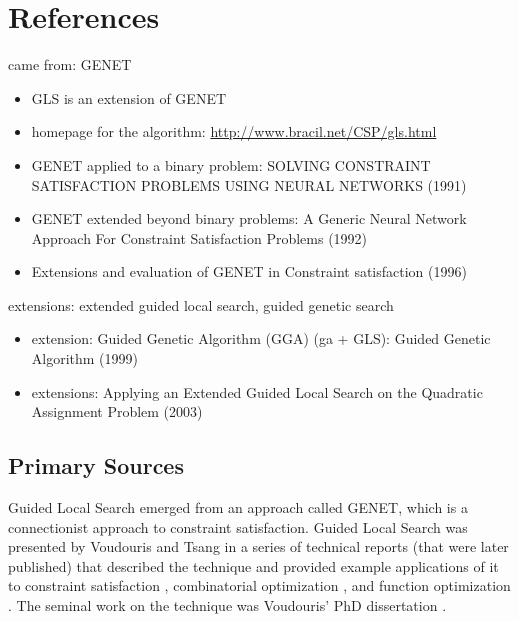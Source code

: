 \documentclass[a4paper, 11pt]{article}
\begin{document}
\section{References}
\label{sec:references}

came from: GENET
\begin{itemize}
	\item GLS is an extension of GENET
	\item homepage for the algorithm: \url{http://www.bracil.net/CSP/gls.html}
	\item GENET applied to a binary problem: SOLVING CONSTRAINT SATISFACTION PROBLEMS USING NEURAL NETWORKS (1991)
	\item GENET extended beyond binary problems: A Generic Neural Network Approach For Constraint Satisfaction Problems (1992)
	\item Extensions and evaluation of GENET in Constraint satisfaction (1996)
\end{itemize}


extensions: extended guided local search, guided genetic search
\begin{itemize}
	\item extension: Guided Genetic Algorithm (GGA) (ga + GLS): Guided Genetic Algorithm (1999)
	\item extensions: Applying an Extended Guided Local Search on the Quadratic Assignment Problem (2003)
\end{itemize}


% 
% 
\subsection{Primary Sources}
Guided Local Search emerged from an approach called GENET, which is a connectionist approach to constraint satisfaction.
Guided Local Search was presented by Voudouris and Tsang in a series of technical reports (that were later published) that described the technique and provided example applications of it to constraint satisfaction \cite{Voudouris1994}, combinatorial optimization \cite{Voudouris1995b, Voudouris1995}, and function optimization \cite{Voudouris1995a}.
The seminal work on the technique was Voudouris' PhD dissertation \cite{Voudouris1997}.


% 
% 
\end{document}
